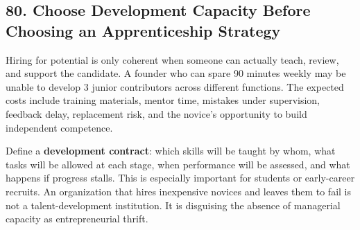\subsection*{80. Choose Development Capacity Before Choosing an Apprenticeship Strategy}

Hiring for potential is only coherent when someone can actually teach, review, and support the candidate. A founder who can spare 90 minutes weekly may be unable to develop 3 junior contributors across different functions. The expected costs include training materials, mentor time, mistakes under supervision, feedback delay, replacement risk, and the novice's opportunity to build independent competence.

Define a \textbf{development contract}: which skills will be taught by whom, what tasks will be allowed at each stage, when performance will be assessed, and what happens if progress stalls. This is especially important for students or early-career recruits. An organization that hires inexpensive novices and leaves them to fail is not a talent-development institution. It is disguising the absence of managerial capacity as entrepreneurial thrift.
